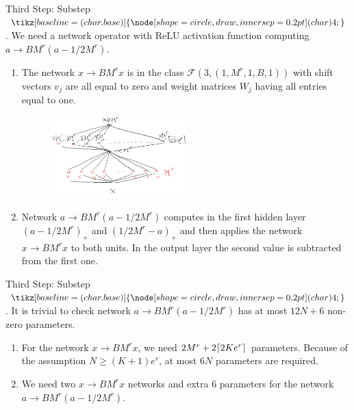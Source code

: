 \documentclass{if-beamer}
\DeclarePairedDelimiter{\ceil}{\lceil}{\rceil}
\newcommand*\circled[1]{\tikz[baseline=(char.base)]{
            \node[shape=circle,draw,inner sep=0.2pt] (char) {#1};}}
\begin{document}
\begin{frame}{Third Step: Substep $\circled{4}$.}
We need a network operator with ReLU activation function computing $a\rightarrow{BM^{r}(a-1/2M^{r})}$.
\begin{enumerate}
    \item The network $x\rightarrow{BM^{r}x}$ is in the class $\mathcal{F}(3,(1,M^{r},1,B,1))$ with shift vectors $v_{j}$ are all equal to zero and weight matrices $W_{j}$ having all entries equal to one.
    \begin{figure}[htbp] 
        \includegraphics[width=0.5\textwidth]{final_step.png}
    \end{figure}
    \item Network $a\rightarrow{BM^{r}(a-1/2M^{r})}$ computes in the first hidden layer $(a-1/2M^{r})_{+}$ and $(1/2M^{r}-a)_{+}$ and then applies the network $x\rightarrow{BM^{r}x}$ to both units. In the output layer the second value is subtracted from the first one. 
\end{enumerate}
\end{frame}

\begin{frame}{Third Step: Substep $\circled{4}$.}
It is trivial to check network $a\rightarrow{BM^{r}(a-1/2M^{r})}$ has at most $12N+6$ non-zero parameters.
\begin{enumerate}
    \item For the network $x\rightarrow{BM^{r}x}$, we need $2M^{r}+2\ceil{2Ke^{r}}$ parameters. Because of the assumption $N\geq (K+1)e^{r}$, at most $6N$ parameters are required.
    \item We need two $x\rightarrow{BM^{r}x}$ networks and extra $6$ parameters for the network  $a\rightarrow{BM^{r}(a-1/2M^{r})}$.
\end{enumerate}
\end{frame}
\end{document}

